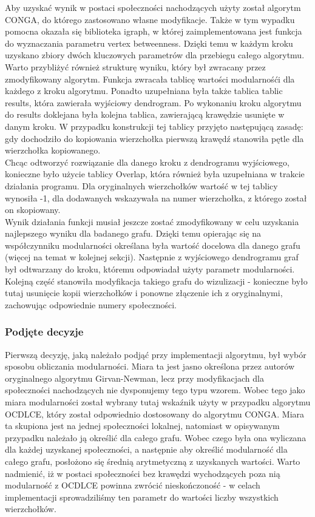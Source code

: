 \documentclass{article}
\begin{document}
Aby uzyskać wynik w postaci społeczności nachodzących użyty został algorytm CONGA, do którego zastosowano własne modyfikacje. Także w tym wypadku pomocna okazała się biblioteka igraph, w której zaimplementowana jest funkcja do wyznaczania parametru vertex betweenness. Dzięki temu w każdym kroku uzyskano zbiory dwóch kluczowych parametrów dla przebiegu całego algorytmu.\\

Warto przybliżyć również strukturę wyniku, który był zwracany przez zmodyfikowany algorytm. Funkcja zwracała tablicę wartości modularnośći dla każdego z kroku algorytmu. Ponadto uzupełniana była także tablica tablic results, która zawierała wyjściowy dendrogram. Po wykonaniu kroku algorytmu do results doklejana była kolejna tablica, zawierającą krawędzie usunięte w danym kroku. W przypadku konstrukcji tej tablicy przyjęto następującą zasadę: gdy dochodziło do kopiowania wierzchołka pierwszą krawędź stanowiła pętle dla wierzchołka kopiowanego.\\

Chcąc odtworzyć rozwiązanie dla danego kroku z dendrogramu wyjściowego, konieczne było użycie tablicy Overlap, która również była uzupełniana w trakcie działania programu. Dla oryginalnych wierzchołków wartość w tej tablicy wynosiła -1, dla dodawanych wskazywała na numer wierzchołka, z którego został on skopiowany.\\

Wynik działania funkcji musiał jeszcze zostać zmodyfikowany w celu uzyskania najlepszego wyniku dla badanego grafu. Dzięki temu opierając się na współczynniku modularności określana była wartość docelowa dla danego grafu (więcej na temat w kolejnej sekcji). Następnie z wyjściowego dendrogramu graf był odtwarzany do kroku, któremu odpowiadał użyty parametr modularności. Kolejną część stanowiła modyfikacja takiego grafu do wizulizacji - konieczne było tutaj usunięcie kopii wierzchołków i ponowne złączenie ich z oryginalnymi, zachowując odpowiednie numery społeczności.

\subsubsection{Podjęte decyzje}
Pierwszą decyzję, jaką należało podjąć przy implementacji algorytmu, był wybór sposobu obliczania modularności. Miara ta jest jasno określona przez autorów oryginalnego algorytmu Girvan-Newman, lecz przy modyfikacjach dla społeczności nachodzących nie dysponujemy tego typu wzorem. Wobec tego jako miara modularności został wybrany tutaj wskaźnik użyty w przypadku algorytmu OCDLCE, który został odpowiednio dostosowany do algorytmu CONGA. Miara ta skupiona jest na jednej społeczności lokalnej, natomiast w opisywanym przypadku należało ją określić dla całego grafu. Wobec czego była ona wyliczana dla każdej uzyskanej społeczności, a następnie aby określić modularność dla całego grafu, posłożono się średnią arytmetyczną z uzyskanych wartości. Warto nadmienić, iż w postaci społeczności bez krawędzi wychodzących poza nią modularność z OCDLCE powinna zwrócić nieskończoność - w celach implementacji sprowadziliśmy ten parametr do wartości liczby wszystkich wierzchołków.\\
\end{document}
